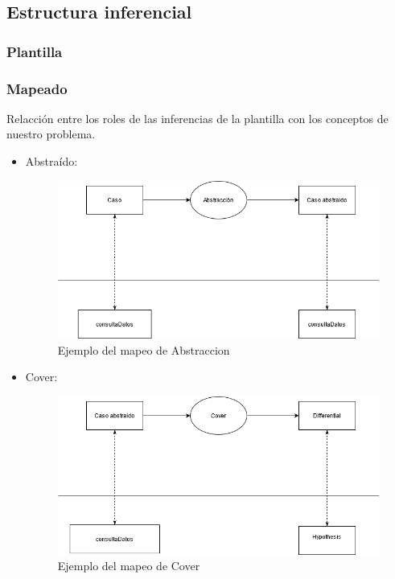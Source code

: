 \subsection{Estructura inferencial}
\subsubsection{Plantilla}
\subsubsection{Mapeado}
Relacción entre los roles de las inferencias de la plantilla con los conceptos de nuestro problema.
\begin{itemize}
  \item Abstraído:
  \begin{figure}[H]
    \centering
    \includegraphics[scale=0.50]{imagenes/abstraccion.png}
    \caption{\label{fig:Cover}Ejemplo del mapeo de Abstraccion}
  \end{figure}
  \item Cover:  
  \begin{figure}[H]
    \centering
    \includegraphics[scale=0.50]{imagenes/cover.png}
    \caption{\label{fig:Cover}Ejemplo del mapeo de Cover}
  \end{figure}

\end{itemize}
